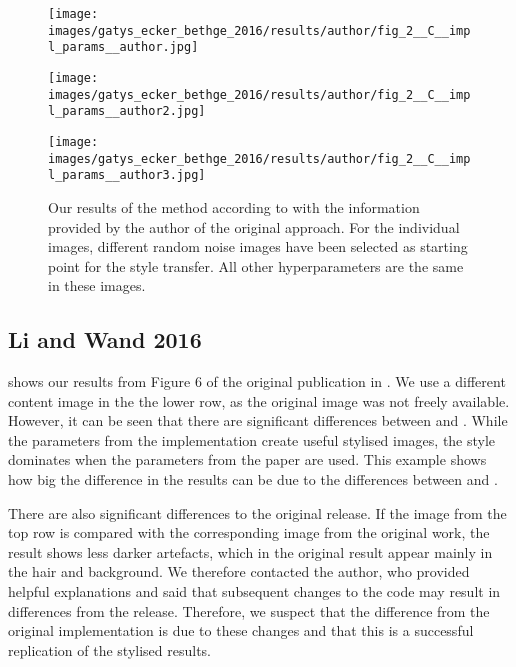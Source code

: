 \begin{figure}[H]
	\centering
	\begin{minipage}[t]{0.3\textwidth}
		\centering
		\texttt{[image: images/gatys\_ecker\_bethge\_2016/results/author/fig\_2\_\_C\_\_impl\_params\_\_author.jpg]}
	\end{minipage}
	\hfill%
	\begin{minipage}[t]{0.3\textwidth}
		\centering
		\texttt{[image: images/gatys\_ecker\_bethge\_2016/results/author/fig\_2\_\_C\_\_impl\_params\_\_author2.jpg]}
	\end{minipage}
	\hfill%
	\begin{minipage}[t]{0.3\textwidth}
		\centering
		\texttt{[image: images/gatys\_ecker\_bethge\_2016/results/author/fig\_2\_\_C\_\_impl\_params\_\_author3.jpg]}
	\end{minipage}
	\caption{Our results of the method according to \cite{GEB2016} with the information provided by the author of the original approach. For the individual images, different random noise images have been selected as starting point for the style transfer. All other hyperparameters are the same in these images.}
	\label{fig:GEB2016_random_init}
\end{figure}


\subsection{Li and Wand 2016}
 shows our results from Figure 6 of the original publication in \cite{LW2016}. We use a different content image in the the lower row, as the original image was not freely available. However, it can be seen that there are significant differences between \paper{} and \implementation{}. While the parameters from the implementation create useful stylised images, the style dominates when the parameters from the paper are used. This example shows how big the difference in the results can be due to the differences between \paper{} and \implementation{}.

There are also significant differences to the original release. If the image from the top row is compared with the corresponding image from the original work, the result shows less darker artefacts, which in the original result appear mainly in the hair and background. We therefore contacted the author, who provided helpful explanations and said that subsequent changes to the code may result in differences from the release. Therefore, we suspect that the difference from the original implementation is due to these changes and that this is a successful replication of the stylised results.

